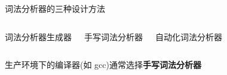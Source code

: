 \begin{frame}{}
  \begin{center}
    {\large 词法分析器的三种设计方法}
  \end{center}

  \vspace{0.30cm}
  \begin{columns}
      \begin{center}
        词法分析器生成器
      \end{center}
      \begin{center}
        手写词法分析器
      \end{center}
      \begin{center}
        自动化词法分析器
      \end{center}
  \end{columns}

  \vspace{0.50cm}
  \begin{center}
    生产环境下的编译器(如 gcc)通常选择{\bf 手写词法分析器}
  \end{center}
\end{frame}

\begin{frame}{}

  \begin{columns}
  \end{columns}
\end{frame}
